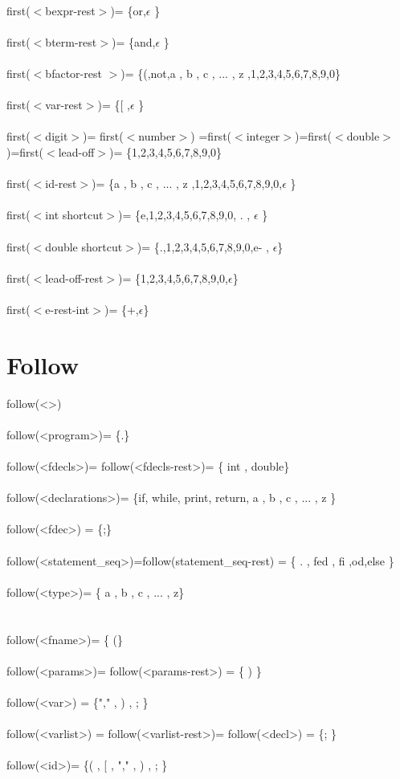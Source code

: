 \documentclass[fleqn]{article}
\begin{document}
\\
first($<$bexpr-rest$>$)= \{or,$\epsilon$ \}\\
\\
first($<$bterm-rest$>$)= \{and,$\epsilon$ \}\\
\\
first($<$bfactor-rest $>$)= \{(,not,a , b , c , ... , z ,1,2,3,4,5,6,7,8,9,0\}\\
\\
first($<$var-rest$>$)= \{[ ,$\epsilon$ \}\\
\\
first($<$digit$>$)= first($<$number$>$) =first($<$integer$>$)=first($<$double$>$)=first($<$lead-off$>$)=  \{1,2,3,4,5,6,7,8,9,0\}\\
\\
first($<$id-rest$>$)= \{a , b , c , ... , z ,1,2,3,4,5,6,7,8,9,0,$\epsilon$ \}\\
\\
first($<$int shortcut$>$)= \{e,1,2,3,4,5,6,7,8,9,0, . , $\epsilon$ \}\\
\\
first($<$double shortcut$>$)= \{.,1,2,3,4,5,6,7,8,9,0,e- , $\epsilon$\}\\
\\
first($<$lead-off-rest$>$)= \{1,2,3,4,5,6,7,8,9,0,$\epsilon$\}\\
\\
first($<$e-rest-int$>$)= \{+,$\epsilon$\}\\
\section{Follow}
follow(<>)\\
\\
follow(<program>)= \{.\}\\
\\
follow(<fdecls>)= follow(<fdecls-rest>)= \{ int , double\}\\
\\
follow(<declarations>)= \{if, while, print, return, a , b , c , ... , z \}\\
\\
follow(<fdec>) =   \{;\}\\
\\
follow(<statement\_seq>)=follow(statement\_seq-rest) =  \{ .  , fed , fi ,od,else \}\\
\\
follow(<type>)= \{ a , b , c , ... , z\} \\ \\
\\
follow(<fname>)= \{ (\}\\
\\
follow(<params>)= follow(<params-rest>) = \{ ) \} \\
\\
follow(<var>) = \{"," ,  ) , ; \}\\
\\
follow(<varlist>) = follow(<varlist-rest>)= follow(<decl>) = \{; \} \\
\\
follow(<id>)= \{( , [ , "," , ) , ; \}\\
\\
\\
\\
\end{document}
